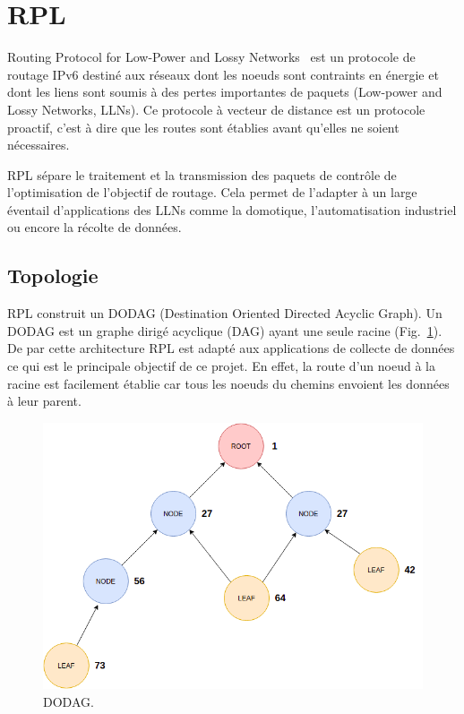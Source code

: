 \newpage
\section{RPL}\label{sec:state-rpl}
\renewcommand{\rightmark}{RPL}

Routing Protocol for Low-Power and Lossy Networks~\cite{rfc:rpl} est un protocole de routage IPv6 destiné aux réseaux dont les noeuds sont contraints en énergie et dont les liens sont soumis à des pertes importantes de paquets (Low-power and Lossy Networks, LLNs).
Ce protocole à vecteur de distance est un protocole proactif, c'est à dire que les routes sont établies avant qu'elles ne soient nécessaires.

RPL sépare le traitement et la transmission des paquets de contrôle de l'optimisation de l'objectif de routage. Cela permet de l'adapter à un large éventail d'applications des LLNs comme la domotique, l'automatisation industriel ou encore la récolte de données.


\subsection*{Topologie}
    RPL construit un DODAG (Destination Oriented Directed Acyclic Graph). Un DODAG est un graphe   dirigé acyclique (DAG) ayant une seule racine (Fig.~\ref{fig:state-dodag}). De par cette architecture RPL est adapté aux applications de collecte de données ce qui est le principale objectif de ce projet. En effet, la route d'un noeud à la racine est facilement établie car tous les noeuds du chemins envoient les données à leur parent.

    \begin{figure}[H]
        \centering
        \includegraphics[scale=0.45]{res/pictures/dodag.drawio.png}
        \caption{DODAG.}
        \label{fig:state-dodag}
    \end{figure}


